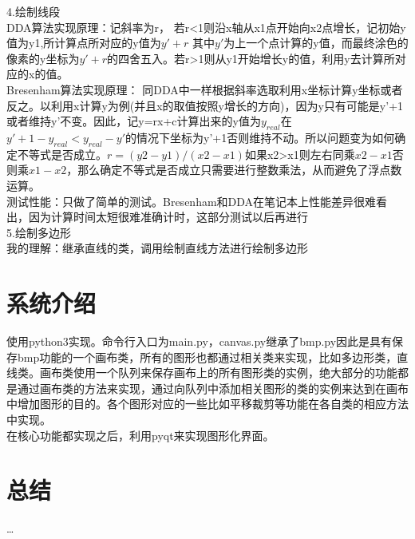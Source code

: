 \documentclass[a4paper,UTF8]{article}
\theoremstyle{definition}
\begin{document}
\noindent{}4.绘制线段\\
\indent{}DDA算法实现原理：记斜率为r，
若r<1则沿x轴从x1点开始向x2点增长，记初始y值为y1,所计算点所对应的y值为$y'+r$ 其中$y'$为上一个点计算的y值，而最终涂色的像素的y坐标为$y'+r$的四舍五入。若r>1则从y1开始增长y的值，利用y去计算所对应的x的值。\\
\indent{}Bresenham算法实现原理：
同DDA中一样根据斜率选取利用x坐标计算y坐标或者反之。以利用x计算y为例(并且x的取值按照y增长的方向)，因为y只有可能是y'+1或者维持y'不变。因此，记y=rx+c计算出来的y值为$y_{real}$在$y'+1-y_{real}<y_{real}-y'$的情况下坐标为y'+1否则维持不动。所以问题变为如何确定不等式是否成立。$r=(y2-y1)/(x2-x1)$如果x2>x1则左右同乘$x2-x1$否则乘$x1-x2$，那么确定不等式是否成立只需要进行整数乘法，从而避免了浮点数运算。\\
\indent{}测试性能：只做了简单的测试。Bresenham和DDA在笔记本上性能差异很难看出，因为计算时间太短很难准确计时，这部分测试以后再进行\\

\noindent{}5.绘制多边形\\
\indent{}我的理解：继承直线的类，调用绘制直线方法进行绘制多边形\\



\section{系统介绍}
\indent{}使用python3实现。命令行入口为main.py，canvas.py继承了bmp.py因此是具有保存bmp功能的一个画布类，所有的图形也都通过相关类来实现，比如多边形类，直线类。画布类使用一个队列来保存画布上的所有图形类的实例，绝大部分的功能都是通过画布类的方法来实现，通过向队列中添加相关图形的类的实例来达到在画布中增加图形的目的。各个图形对应的一些比如平移裁剪等功能在各自类的相应方法中实现。\\
\indent{}在核心功能都实现之后，利用pyqt来实现图形化界面。\\
\section{总结}
\dots

%

\end{document}
